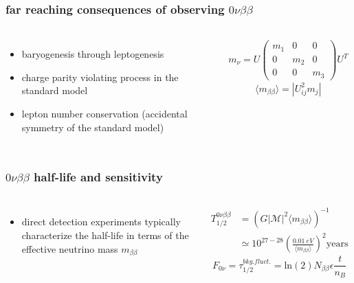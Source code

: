 \documentclass{beamer}
\begin{document}
	\begin{frame}
		\frametitle{far reaching consequences of observing $0\nu\beta\beta$}
		\begin{columns}[c] %
			
			\begin{itemize}
				\setlength\itemsep{2em}
				\item baryogenesis through leptogenesis
				\item charge parity violating process in the standard model
				\item lepton number conservation (accidental symmetry of the standard model)
			\end{itemize}
			
			\begin{gather*}
			m_{\nu} = U 
			\begin{pmatrix} m_1 & 0 & 0 \\
							0 & m_2 & 0 \\
							0 & 0 & m_3
			\end{pmatrix}
			U^{T}
			\end{gather*} 
			\begin{equation*}
			\langle m_{\beta\beta}\rangle = |U_{ij}^2 m_j|
			\end{equation*}
			
		\end{columns}
	\end{frame}	
	
	\begin{frame}
		\frametitle{$0\nu\beta\beta$ half-life and sensitivity}
		\begin{columns}[c] %
			
			\begin{itemize}
				\setlength\itemsep{2em}
				\item direct detection experiments typically characterize the half-life in terms of the effective neutrino mass $m_{\beta\beta}$
			\end{itemize}
			
			\begin{eqnarray*}
			T_{1/2}^{0\nu\beta\beta} &=\left(G|\mathcal{M}|^2 \langle m_{\beta\beta}\rangle\right)^{-1} \\
			& \simeq 10^{27-28} \left(\frac{0.01 \ eV}{\langle m_{\beta\beta}\rangle}\right)^2 \text{years}
			\end{eqnarray*}
			\begin{equation*}
			F_{0\nu} = \tau_{1/2}^{bkg. fluct.} = \text{ln}(2)N_{\beta\beta}\epsilon \frac{t}{n_B}
			\end{equation*}
		\end{columns}
	\end{frame}	
	
\end{document}
